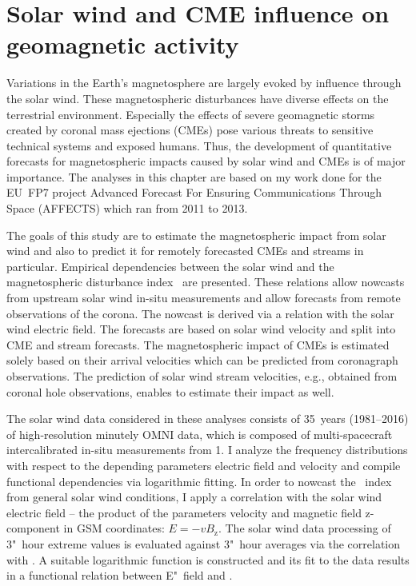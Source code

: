 
\chapter{Solar wind and CME influence on geomagnetic activity}
\label{chap:chapter2}

Variations in the Earth's magnetosphere are largely evoked by influence through the solar wind. These magnetospheric disturbances have diverse effects on the terrestrial environment. Especially the effects of severe geomagnetic storms created by coronal mass ejections (CMEs) pose various threats to sensitive technical systems and exposed humans. Thus, the development of quantitative forecasts for magnetospheric impacts caused by solar wind and CMEs is of major importance.
The analyses in this chapter are based on my work done for the EU~FP7 project Advanced Forecast For Ensuring Communications Through Space (AFFECTS) which ran from 2011 to 2013.

The goals of this study are to estimate the magnetospheric impact from solar wind and also to predict it for remotely forecasted CMEs and streams in particular. Empirical dependencies between the solar wind and the magnetospheric disturbance index~\Kp{} are presented. These relations allow nowcasts from upstream solar wind in-situ measurements and allow forecasts from remote observations of the corona. The \Kp{} nowcast is derived via a relation with the solar wind electric field. The \Kp{} forecasts are based on solar wind velocity and split into CME and stream forecasts. The magnetospheric impact of CMEs is estimated solely based on their arrival velocities which can be predicted from coronagraph observations. The prediction of solar wind stream velocities, e.g., obtained from coronal hole observations, enables to estimate their impact as well.

The solar wind data considered in these analyses consists of 35~years (1981--2016) of high-resolution minutely OMNI data, which is composed of multi-spacecraft intercalibrated in-situ measurements from \SI{1}{\au}. I analyze the \Kp{} frequency distributions with respect to the depending parameters electric field and velocity and compile functional dependencies via logarithmic fitting.
In order to nowcast the \Kp~index from general solar wind conditions, I apply a correlation with the solar wind electric field -- the product of the parameters velocity and magnetic field z-component in GSM coordinates: $E = - v B_\text{z}$. The solar wind data processing of 3"~hour extreme values is evaluated against 3"~hour averages via the correlation with \Kp{}. A suitable logarithmic function is constructed and its fit to the data results in a functional relation between E"~field and \Kp{}.

